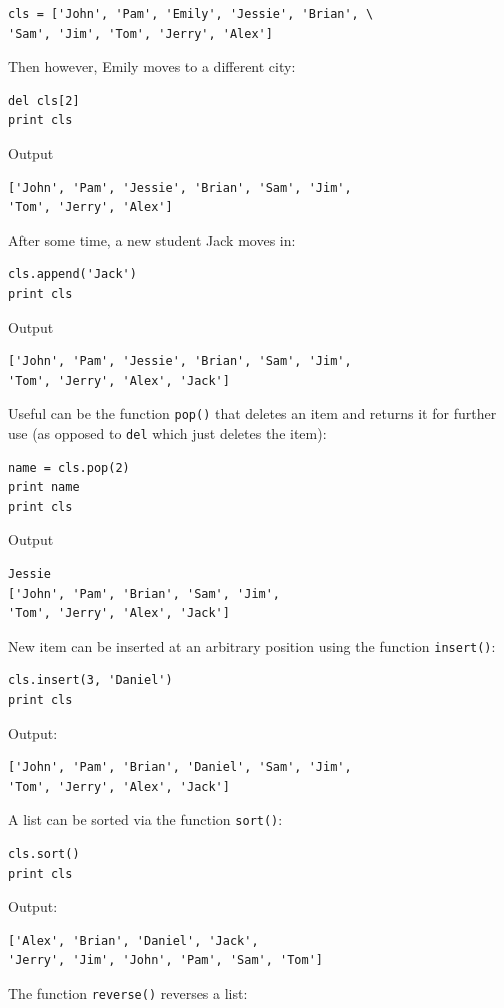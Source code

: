 \begin{verbatim}
cls = ['John', 'Pam', 'Emily', 'Jessie', 'Brian', \
'Sam', 'Jim', 'Tom', 'Jerry', 'Alex']
\end{verbatim}
Then however, Emily moves to a different city:

\begin{verbatim}
del cls[2]
print cls
\end{verbatim}
Output

\begin{verbatim}
['John', 'Pam', 'Jessie', 'Brian', 'Sam', 'Jim', 
'Tom', 'Jerry', 'Alex']
\end{verbatim}
After some time, a new student Jack moves in:

\begin{verbatim}
cls.append('Jack')
print cls
\end{verbatim}
Output

\begin{verbatim}
['John', 'Pam', 'Jessie', 'Brian', 'Sam', 'Jim', 
'Tom', 'Jerry', 'Alex', 'Jack']
\end{verbatim}
Useful can be the function {\tt pop()} that deletes an item and returns it for further
use (as opposed to {\tt del} which just deletes the item):

\begin{verbatim}
name = cls.pop(2)
print name 
print cls
\end{verbatim}
Output

\begin{verbatim}
Jessie
['John', 'Pam', 'Brian', 'Sam', 'Jim', 
'Tom', 'Jerry', 'Alex', 'Jack']
\end{verbatim}
New item can be inserted at an arbitrary position using the function {\tt insert()}:

\begin{verbatim}
cls.insert(3, 'Daniel')
print cls
\end{verbatim}
Output:

\begin{verbatim}
['John', 'Pam', 'Brian', 'Daniel', 'Sam', 'Jim', 
'Tom', 'Jerry', 'Alex', 'Jack']
\end{verbatim}
A list can be sorted via the function {\tt sort()}:

\begin{verbatim}
cls.sort()
print cls
\end{verbatim}
Output:

\begin{verbatim}
['Alex', 'Brian', 'Daniel', 'Jack', 
'Jerry', 'Jim', 'John', 'Pam', 'Sam', 'Tom']
\end{verbatim}
The function {\tt reverse()} reverses a list:

